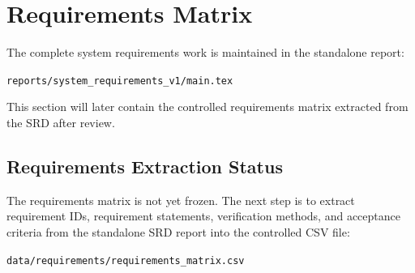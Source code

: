 \chapter{Requirements Matrix}

The complete system requirements work is maintained in the standalone report:

\begin{center}
\texttt{reports/system\_requirements\_v1/main.tex}
\end{center}

This section will later contain the controlled requirements matrix extracted from the SRD after review.

\section{Requirements Extraction Status}

The requirements matrix is not yet frozen. The next step is to extract requirement IDs, requirement statements, verification methods, and acceptance criteria from the standalone SRD report into the controlled CSV file:

\begin{center}
\texttt{data/requirements/requirements\_matrix.csv}
\end{center}
